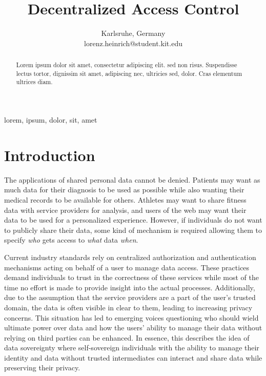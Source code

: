 \documentclass[conference]{IEEEtran}
\begin{document}
\title{Decentralized Access Control}%

\author{
  Karlsruhe, Germany \\
  lorenz.heinrich@student.kit.edu
}

\maketitle

\begin{abstract}
  Lorem ipsum dolor sit amet, consectetur adipiscing elit. sed non risus. Suspendisse lectus tortor, dignissim sit amet, adipiscing nec, ultricies sed, dolor. Cras elementum ultrices diam.
\end{abstract}

\begin{IEEEkeywords}
  lorem, ipsum, dolor, sit, amet
\end{IEEEkeywords}

\section{Introduction}
The applications of shared personal data cannot be denied.
Patients may want as much data for their diagnosis to be used as possible while also wanting their medical records to be available for others. \cite{hollis_share_2016}
Athletes may want to share fitness data with service providers for analysis, and users of the web may want their data to be used for a personalized experience.\cite{nasir_council_nodate}
However, if individuals do not want to publicly share their data, some kind of mechanism is required allowing them to specify \textit{who} gets access to \textit{what} data \textit{when}.

Current industry standards rely on centralized authorization and authentication mechanisms acting on behalf of a user to manage data access. \cite{hardt_oauth_2012,noauthor_googles_nodate}
These practices demand individuals to trust in the correctness of these services while most of the time no effort is made to provide insight into the actual processes.
Additionally, due to the assumption that the service providers are a part of the user's trusted domain, the data is often visible in clear to them, leading to increasing privacy concerns.
This situation has led to emerging voices questioning who should wield ultimate power over data and how the users' ability to manage their data without relying on third parties can be enhanced. \cite{noauthor_w3f_nodate}
In essence, this describes the idea of data sovereignty where self-sovereign individuals with the ability to manage their identity and data without trusted intermediates can interact and share data while preserving their privacy. \cite{ernstberger_sok_2023}
\end{document}
